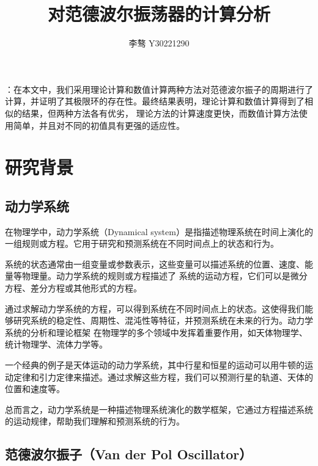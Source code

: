 \documentclass[10.5pt,oneside,a4paper]{article}
\title{\textbf{对范德波尔振荡器的计算分析}}
\author{\zihao{-4} 李骜 \quad Y30221290}
\date{}
\theoremstyle{mystyle}
\begin{document}
\maketitle
\thispagestyle{fancy}
\vspace{-1cm}
\setlength{\abstitleskip}{-2em}
\setlength{\absleftindent}{0pt}
\setlength{\absrightindent}{0pt}
\begin{onecolabstract}
\songti {}
：在本文中，我们采用理论计算和数值计算两种方法对范德波尔振子的周期进行了计算，并证明了其极限环的存在性。最终结果表明，理论计算和数值计算得到了相似的结果，但两种方法各有优劣，
理论方法的计算速度更快，而数值计算方法使用简单，并且对不同的初值具有更强的适应性。

\vspace{-1em}
\end{onecolabstract}

\vspace{1em}

\section{研究背景}

\subsection{动力学系统}

在物理学中，动力学系统（Dynamical system）是指描述物理系统在时间上演化的一组规则或方程。它用于研究和预测系统在不同时间点上的状态和行为。

系统的状态通常由一组变量或参数表示，这些变量可以描述系统的位置、速度、能量等物理量。动力学系统的规则或方程描述了
系统的运动方程，它们可以是微分方程、差分方程或其他形式的方程。

通过求解动力学系统的方程，可以得到系统在不同时间点上的状态。这使得我们能够研究系统的稳定性、周期性、混沌性等特征，并预测系统在未来的行为。动力学系统的分析和理论框架
在物理学的多个领域中发挥着重要作用，如天体物理学、统计物理学、流体力学等。

一个经典的例子是天体运动的动力学系统，其中行星和恒星的运动可以用牛顿的运动定律和引力定律来描述。通过求解这些方程，我们可以预测行星的轨道、天体的位置和速度等。

总而言之，动力学系统是一种描述物理系统演化的数学框架，它通过方程描述系统的运动规律，帮助我们理解和预测系统的行为。

\subsection{范德波尔振子（Van der Pol Oscillator）}
\end{document}
